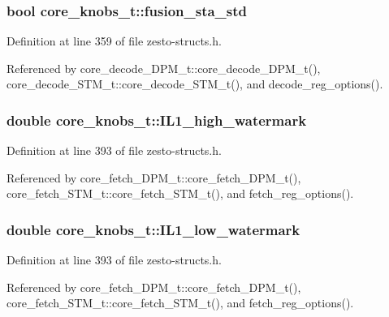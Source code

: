 \subsubsection[{fusion\_\-sta\_\-std}]{\setlength{\rightskip}{0pt plus 5cm}bool {\bf core\_\-knobs\_\-t::fusion\_\-sta\_\-std}}\label{structcore__knobs__t_c1078eabfb1f70cec1fa167cb5531e98}




Definition at line 359 of file zesto-structs.h.

Referenced by core\_\-decode\_\-DPM\_\-t::core\_\-decode\_\-DPM\_\-t(), core\_\-decode\_\-STM\_\-t::core\_\-decode\_\-STM\_\-t(), and decode\_\-reg\_\-options().
\subsubsection[{IL1\_\-high\_\-watermark}]{\setlength{\rightskip}{0pt plus 5cm}double {\bf core\_\-knobs\_\-t::IL1\_\-high\_\-watermark}}\label{structcore__knobs__t_295827f119458b7b8c2fbc79591a38da}




Definition at line 393 of file zesto-structs.h.

Referenced by core\_\-fetch\_\-DPM\_\-t::core\_\-fetch\_\-DPM\_\-t(), core\_\-fetch\_\-STM\_\-t::core\_\-fetch\_\-STM\_\-t(), and fetch\_\-reg\_\-options().
\subsubsection[{IL1\_\-low\_\-watermark}]{\setlength{\rightskip}{0pt plus 5cm}double {\bf core\_\-knobs\_\-t::IL1\_\-low\_\-watermark}}\label{structcore__knobs__t_ed804d55e9d5d9c794b6eafcc7e82a24}




Definition at line 393 of file zesto-structs.h.

Referenced by core\_\-fetch\_\-DPM\_\-t::core\_\-fetch\_\-DPM\_\-t(), core\_\-fetch\_\-STM\_\-t::core\_\-fetch\_\-STM\_\-t(), and fetch\_\-reg\_\-options().
